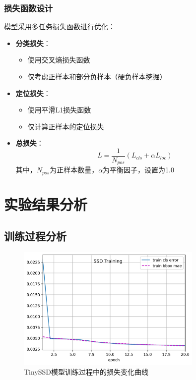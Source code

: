 \documentclass[UTF8]{ctexart}
\begin{document}
\subsubsection{损失函数设计}
模型采用多任务损失函数进行优化：
\begin{itemize}
    \item \textbf{分类损失}：
    \begin{itemize}
        \item 使用交叉熵损失函数
        \item 仅考虑正样本和部分负样本（硬负样本挖掘）
    \end{itemize}
    \item \textbf{定位损失}：
    \begin{itemize}
        \item 使用平滑L1损失函数
        \item 仅计算正样本的定位损失
    \end{itemize}
    \item \textbf{总损失}：
    \begin{equation}
        L = \frac{1}{N_{pos}}(L_{cls} + \alpha L_{loc})
    \end{equation}
    其中，$N_{pos}$为正样本数量，$\alpha$为平衡因子，设置为1.0
\end{itemize}

\section{实验结果分析}

\subsection{训练过程分析}
\begin{figure}[htbp]
    \centering
    \includegraphics[width=0.8\textwidth]{picture/ssd_training_20241125_093259.png}
    \caption{TinySSD模型训练过程中的损失变化曲线}
    \label{fig:training_curve}
\end{figure}
\end{document}
